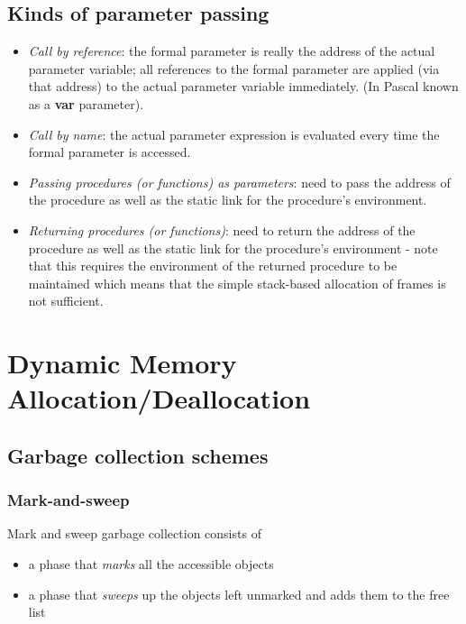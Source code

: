 \documentclass[fontsize=10pt,a4paper]{article}
\begin{document}
\begin{multicols}{3}
    \subsection{Kinds of parameter passing}

    \begin{itemize}
        \item \textit{Call by reference}: the formal parameter is really the address of the actual parameter variable; all references to the formal parameter are applied (via that address) to the actual parameter variable immediately. (In Pascal known as a \textbf{var} parameter).
        \item \textit{Call by name}: the actual parameter expression is evaluated every time the formal parameter is accessed.
        \item \textit{Passing procedures (or functions) as parameters}: need to pass the address of the procedure as well as the static link for the procedure’s environment.
        \item \textit{Returning procedures (or functions)}: need to return the address of the procedure as well as the static link for the procedure’s environment - note that this requires the environment of the returned procedure to be maintained which means that the simple stack-based allocation of frames is not sufficient.

    \end{itemize}

    \section{Dynamic Memory Allocation/Deallocation}

    \subsection{Garbage collection schemes}

    \subsubsection{Mark-and-sweep}

    Mark and sweep garbage collection consists of

    \begin{itemize}
        \item a phase that \textit{marks} all the accessible objects
        \item a phase that \textit{sweeps} up the objects left unmarked and adds them to the free list
    \end{itemize}


\end{multicols}
\end{document}
